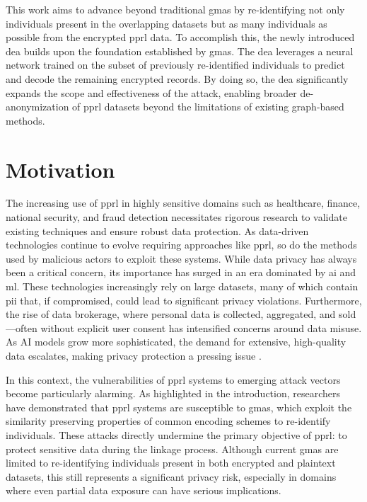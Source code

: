 This work aims to advance beyond traditional \ac{gma}s by re-identifying not only individuals present in the overlapping datasets but as many individuals as possible from the encrypted \ac{pprl} data. 
To accomplish this, the newly introduced \ac{dea} builds upon the foundation established by \ac{gma}s. 
The \ac{dea} leverages a neural network trained on the subset of previously re-identified individuals to predict and decode the remaining encrypted records. 
By doing so, the \ac{dea} significantly expands the scope and effectiveness of the attack, enabling broader de-anonymization of \ac{pprl} datasets beyond the limitations of existing graph-based methods.


\section{Motivation}  \label{sec:motivation}
The increasing use of \ac{pprl} in highly sensitive domains such as healthcare, finance, national security, and fraud detection necessitates rigorous research to validate existing techniques and ensure robust data protection. 
As data-driven technologies continue to evolve requiring approaches like \ac{pprl}, so do the methods used by malicious actors to exploit these systems.
While data privacy has always been a critical concern, its importance has surged in an era dominated by \ac{ai} and \ac{ml}. 
These technologies increasingly rely on large datasets, many of which contain \ac{pii} that, if compromised, could lead to significant privacy violations. 
Furthermore, the rise of data brokerage, where personal data is collected, aggregated, and sold—often without explicit user consent has intensified concerns around data misuse. 
As AI models grow more sophisticated, the demand for extensive, high-quality data escalates, making privacy protection a pressing issue \cite{ldc2024,cacgroup2024,arxiv2024}.

In this context, the vulnerabilities of \ac{pprl} systems to emerging attack vectors become particularly alarming. 
As highlighted in the introduction, researchers have demonstrated that \ac{pprl} systems are susceptible to \ac{gma}s, which exploit the similarity preserving properties of common encoding schemes to re-identify individuals. 
These attacks directly undermine the primary objective of \ac{pprl}: to protect sensitive data during the linkage process. 
Although current \ac{gma}s are limited to re-identifying individuals present in both encrypted and plaintext datasets, this still represents a significant privacy risk, especially in domains where even partial data exposure can have serious implications.

